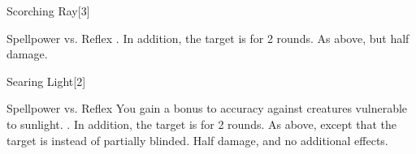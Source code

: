 \begin{spellsection}{Scorching Ray}[3]
    \begin{spellheader}
    \end{spellheader}
    \begin{spellcontent}
        \begin{spelltargetinginfo}
        \end{spelltargetinginfo}
        \begin{spelleffects}
            \begin{spellattack}{Spellpower vs. Reflex}
                \spellsuccess {}. In addition, the target is \ignited for 2 rounds.
                \spellfailure As above, but half damage.
            \end{spellattack}
        \end{spelleffects}
    \end{spellcontent}
    \begin{spellfooter}
        \miscastrandom
    \end{spellfooter}
\end{spellsection}

\begin{spellsection}{Searing Light}[2]
    \begin{spellheader}
    \end{spellheader}
    \begin{spellcontent}
        \begin{spelltargetinginfo}
        \end{spelltargetinginfo}
        \begin{spelleffects}
            \begin{spellattack}{Spellpower vs. Reflex}
                \spellspecial You gain a  bonus to accuracy against creatures vulnerable to sunlight.
                \spellsuccess {}. In addition, the target is \partiallyblinded for 2 rounds.
                \spellcritical As above, except that the target is \blinded instead of partially blinded.
                \spellfailure Half damage, and no additional effects.
            \end{spellattack}
        \end{spelleffects}
    \end{spellcontent}
    \begin{spellfooter}
        \miscastrandom
    \end{spellfooter}
\end{spellsection}

